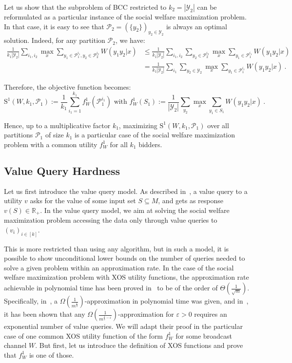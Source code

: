  Let us show that the subproblem of \textsc{BCC} restricted to $k_2=|\mathcal{Y}_2|$ can be reformulated as a particular instance of the social welfare maximization problem. In that case, it is easy to see that $\mathcal{P}_2 = (\{y_2\})_{y_2 \in \mathcal{Y}_2}$ is always an optimal solution. Indeed, for any partition $\mathcal{P}_2$, we have:
\begin{equation}
  \begin{aligned}
    \frac{1}{k_1|\mathcal{Y}_2|}\sum_{i_1,i_2}  \max_x \sum_{y_1 \in \mathcal{P}_1^{i_1}, y_2 \in \mathcal{P}_2^{i_2}} W(y_1y_2|x) &\leq \frac{1}{k_1|\mathcal{Y}_2|}\sum_{i_1,i_2}  \sum_{y_2 \in \mathcal{P}_2^{i_2}} \max_x \sum_{y_1 \in \mathcal{P}_1^{i_1}} W(y_1y_2|x) \\
    &= \frac{1}{k_1|\mathcal{Y}_2|}\sum_{i_1}  \sum_{y_2 \in \mathcal{Y}_2} \max_x \sum_{y_1 \in \mathcal{P}_1^{i_1}} W(y_1y_2|x) \ .
  \end{aligned}
\end{equation}

Therefore, the objective function becomes:
\[ \mathrm{S}^1(W,k_1,\mathcal{P}_1) := \frac{1}{k_1}\sum_{i_1=1}^{k_1} f_W^1(\mathcal{P}_1^{i_1}) \text{ with } f_W^1(S_1) := \frac{1}{|\mathcal{Y}_2|}\sum_{y_2} \max_x \sum_{y_1 \in S_1} W(y_1y_2|x)\ .\]


Hence, up to a multiplicative factor $k_1$, maximizing $\mathrm{S}^1(W,k_1,\mathcal{P}_1)$ over all partitions $\mathcal{P}_1$ of size $k_1$ is a particular case of the social welfare maximization problem with a common utility $f_W^1$ for all $k_1$ bidders.

\subsection{Value Query Hardness}
Let us first introduce the value query model. As described in~\cite{DS06,MSV08}, a value query to a utility $v$ asks for the value of some input set $S \subseteq M$, and gets as response $v(S) \in \mathbb{R}_+$. In the value query model, we aim at solving the social welfare maximization problem accessing the data only through value queries to $(v_i)_{i \in [k]}$.

This is more restricted than using any algorithm, but in such a model, it is possible to show unconditional lower bounds on the number of queries needed to solve a given problem within an approximation rate. In the case of the social welfare maximization problem with \textrm{XOS} utility functions, the approximation rate achievable in polynomial time has been proved in~\cite{DS06,MSV08} to be of the order of $\Theta\left(\frac{1}{\sqrt{m}}\right)$. Specifically, in~\cite{DS06}, a $\Omega\left(\frac{1}{m^{\frac{1}{2}}}\right)$-approximation in polynomial time was given, and in~\cite{MSV08}, it has been shown that any $\Omega\left(\frac{1}{m^{\frac{1}{2}-\varepsilon}}\right)$-approximation for $\varepsilon > 0$ requires an exponential number of value queries. We will adapt their proof in the particular case of one common \textrm{XOS} utility function of the form $f_W^1$ for some broadcast channel $W$. But first, let us introduce the definition of \textrm{XOS} functions and prove that $f_W^1$ is one of those.

